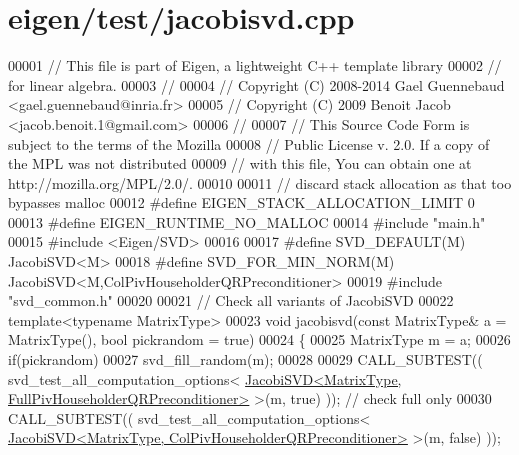 \hypertarget{eigen_2test_2jacobisvd_8cpp_source}{}\section{eigen/test/jacobisvd.cpp}
\label{eigen_2test_2jacobisvd_8cpp_source}

\begin{DoxyCode}
00001 \textcolor{comment}{// This file is part of Eigen, a lightweight C++ template library}
00002 \textcolor{comment}{// for linear algebra.}
00003 \textcolor{comment}{//}
00004 \textcolor{comment}{// Copyright (C) 2008-2014 Gael Guennebaud <gael.guennebaud@inria.fr>}
00005 \textcolor{comment}{// Copyright (C) 2009 Benoit Jacob <jacob.benoit.1@gmail.com>}
00006 \textcolor{comment}{//}
00007 \textcolor{comment}{// This Source Code Form is subject to the terms of the Mozilla}
00008 \textcolor{comment}{// Public License v. 2.0. If a copy of the MPL was not distributed}
00009 \textcolor{comment}{// with this file, You can obtain one at http://mozilla.org/MPL/2.0/.}
00010 
00011 \textcolor{comment}{// discard stack allocation as that too bypasses malloc}
00012 \textcolor{preprocessor}{#define EIGEN\_STACK\_ALLOCATION\_LIMIT 0}
00013 \textcolor{preprocessor}{#define EIGEN\_RUNTIME\_NO\_MALLOC}
00014 \textcolor{preprocessor}{#include "main.h"}
00015 \textcolor{preprocessor}{#include <Eigen/SVD>}
00016 
00017 \textcolor{preprocessor}{#define SVD\_DEFAULT(M) JacobiSVD<M>}
00018 \textcolor{preprocessor}{#define SVD\_FOR\_MIN\_NORM(M) JacobiSVD<M,ColPivHouseholderQRPreconditioner>}
00019 \textcolor{preprocessor}{#include "svd\_common.h"}
00020 
00021 \textcolor{comment}{// Check all variants of JacobiSVD}
00022 \textcolor{keyword}{template}<\textcolor{keyword}{typename} MatrixType>
00023 \textcolor{keywordtype}{void} jacobisvd(\textcolor{keyword}{const} MatrixType& a = MatrixType(), \textcolor{keywordtype}{bool} pickrandom = \textcolor{keyword}{true})
00024 \{
00025   MatrixType m = a;
00026   \textcolor{keywordflow}{if}(pickrandom)
00027     svd\_fill\_random(m);
00028 
00029   CALL\_SUBTEST(( svd\_test\_all\_computation\_options<
      \hyperlink{group___s_v_d___module_class_eigen_1_1_jacobi_s_v_d}{JacobiSVD<MatrixType, FullPivHouseholderQRPreconditioner>}
       >(m, \textcolor{keyword}{true})  )); \textcolor{comment}{// check full only}
00030   CALL\_SUBTEST(( svd\_test\_all\_computation\_options<
      \hyperlink{group___s_v_d___module_class_eigen_1_1_jacobi_s_v_d}{JacobiSVD<MatrixType, ColPivHouseholderQRPreconditioner>}
        >(m, \textcolor{keyword}{false}) ));

\end{DoxyCode}
